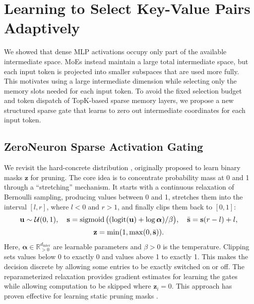 \section{Learning to Select Key-Value Pairs Adaptively}
\label{sec:zon-sparse_gating}
We showed that dense MLP activations occupy only part of the available intermediate space.
MoEs instead maintain a large total intermediate space, but each input token is projected
into smaller subspaces that are used more fully.
This motivates using a large intermediate dimension while selecting only the memory slots needed for each input token.
To avoid the fixed selection budget and token dispatch of TopK-based sparse memory layers,
we propose a new structured sparse gate that learns to zero out intermediate coordinates
for each input token.
\subsection{ZeroNeuron Sparse Activation Gating}
We revisit the hard-concrete distribution \citep{louizos2018learning}, originally
proposed to learn binary masks $\mathbf{z}$ for pruning. The core idea is to concentrate probability
mass at 0 and 1 through a ``stretching'' mechanism. It starts with a continuous relaxation
of Bernoulli sampling, producing values between 0 and 1, stretches them into the
interval $[l,r]$, where $l<0$ and $r>1$, and finally clips them back to $[0,1]$:
\begin{equation}
    \resizebox{\dimexpr\linewidth-3em\relax}{!}{$\displaystyle
    \begin{gathered}
    \mathbf{u}\sim\mathcal{U}(0,1),\quad
    \mathbf{s}=\operatorname{sigmoid}\big((\operatorname{logit}(\mathbf{u})+\log\boldsymbol{\alpha})/\beta\big),\quad
    \bar{\mathbf{s}}=\mathbf{s}(r-l)+l,\\[2pt]
    \mathbf{z}=\min(1,\max(0,\bar{\mathbf{s}})).
    \end{gathered}
    $}
\end{equation}
Here, $\boldsymbol{\alpha} \in \mathbb{R}_{>0}^{d_{\text{inter}}}$ are learnable parameters and $\beta>0$ is the temperature.
Clipping sets values below 0 to exactly 0 and values above 1 to exactly 1.
This makes the decision discrete by allowing some entries to be exactly switched on or off.
The reparameterized relaxation provides gradient estimates for learning the gates while allowing computation to be skipped where $\mathbf{z}_i = 0$. This approach has proven effective
for learning static pruning masks \citep{xia2024sheared, wang-etal-2020-structured}.

